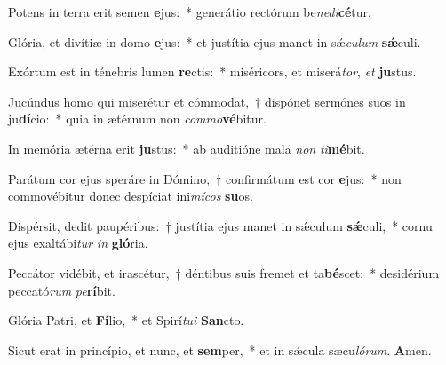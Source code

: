 \item Potens in terra erit semen \textbf{e}jus:~* generátio rectórum be\textit{ne}\textit{di}\textbf{cé}tur.

\item Glória, et divítiæ in domo \textbf{e}jus:~* et justítia ejus manet in sǽ\textit{cu}\textit{lum} \textbf{sǽ}culi.

\item Exórtum est in ténebris lumen \textbf{re}ctis:~* miséricors, et miserá\textit{tor}, \textit{et} \textbf{ju}stus.

\item Jucúndus homo qui miserétur et cómmodat,~† dispónet sermónes suos in ju\textbf{dí}cio:~* quia in ætérnum non \textit{com}\textit{mo}\textbf{vé}bitur.

\item In memória ætérna erit \textbf{ju}stus:~* ab auditióne mala \textit{non} \textit{ti}\textbf{mé}bit.

\item Parátum cor ejus speráre in Dómino,~† confirmátum est cor \textbf{e}jus:~* non commovébitur donec despíciat ini\textit{mí}\textit{cos} \textbf{su}os.

\item Dispérsit, dedit paupéribus:~† justítia ejus manet in sǽculum \textbf{sǽ}culi,~* cornu ejus exaltábi\textit{tur} \textit{in} \textbf{gló}ria.

\item Peccátor vidébit, et irascétur,~† déntibus suis fremet et ta\textbf{bé}scet:~* desidérium peccató\textit{rum} \textit{pe}\textbf{rí}bit.

\item Glória Patri, et \textbf{Fí}lio,~* et Spirí\textit{tu}\textit{i} \textbf{San}cto.

\item Sicut erat in princípio, et nunc, et \textbf{sem}per,~* et in sǽcula sæcu\textit{ló}\textit{rum}. \textbf{A}men.
